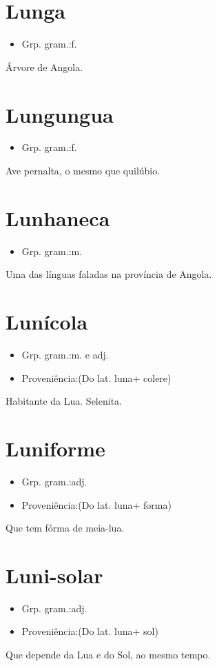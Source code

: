 \section{Lunga}
\begin{itemize}
\item {Grp. gram.:f.}
\end{itemize}
Árvore de Angola.
\section{Lungungua}
\begin{itemize}
\item {Grp. gram.:f.}
\end{itemize}
Ave pernalta, o mesmo que \textunderscore quilúbio\textunderscore .
\section{Lunhaneca}
\begin{itemize}
\item {Grp. gram.:m.}
\end{itemize}
Uma das línguas faladas na província de Angola.
\section{Lunícola}
\begin{itemize}
\item {Grp. gram.:m.  e  adj.}
\end{itemize}
\begin{itemize}
\item {Proveniência:(Do lat. \textunderscore luna\textunderscore  + \textunderscore colere\textunderscore )}
\end{itemize}
Habitante da Lua.
Selenita.
\section{Luniforme}
\begin{itemize}
\item {Grp. gram.:adj.}
\end{itemize}
\begin{itemize}
\item {Proveniência:(Do lat. \textunderscore luna\textunderscore  + \textunderscore forma\textunderscore )}
\end{itemize}
Que tem fórma de meia-lua.
\section{Luni-solar}
\begin{itemize}
\item {Grp. gram.:adj.}
\end{itemize}
\begin{itemize}
\item {Proveniência:(Do lat. \textunderscore luna\textunderscore  + \textunderscore sol\textunderscore )}
\end{itemize}
Que depende da Lua e do Sol, ao mesmo tempo.
